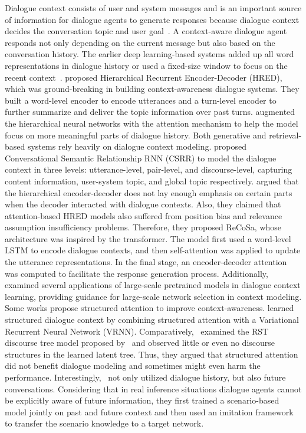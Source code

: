 \label{Context Awareness}
Dialogue context consists of user and system messages and is an important source of information for dialogue agents to generate responses because dialogue context decides the conversation topic and user goal~. A context-aware dialogue agent responds not only depending on the current message but also based on the conversation history. The earlier deep learning-based systems added up all word representations in dialogue history or used a fixed-size window to focus on the recent context~.  proposed Hierarchical Recurrent Encoder-Decoder (HRED), which was ground-breaking in building context-awareness dialogue systems. They built a word-level encoder to encode utterances and a turn-level encoder to further summarize and deliver the topic information over past turns.  augmented the hierarchical neural networks with the attention mechanism to help the model focus on more meaningful parts of dialogue history. 
Both generative and retrieval-based systems rely heavily on dialogue context modeling.  proposed Conversational Semantic Relationship RNN (CSRR) to model the dialogue context in three levels: utterance-level, pair-level, and discourse-level, capturing content information, user-system topic, and global topic respectively.  argued that the hierarchical encoder-decoder does not lay enough emphasis on certain parts when the decoder interacted with dialogue contexts. Also, they claimed that attention-based HRED models also suffered from position bias and relevance assumption insufficiency problems. Therefore, they proposed ReCoSa, whose architecture was inspired by the transformer. The model first used a word-level LSTM to encode dialogue contexts, and then self-attention was applied to update the utterance representations. In the final stage, an encoder-decoder attention was computed to facilitate the response generation process. Additionally,~ examined several applications of large-scale pretrained models in dialogue context learning, providing guidance for large-scale network selection in context modeling.
Some works propose structured attention to improve context-awareness.  learned structured dialogue context by combining structured attention with a Variational Recurrent Neural Network (VRNN). Comparatively,~ examined the RST discourse tree model proposed by~ and observed little or even no discourse structures in the learned latent tree. Thus, they argued that structured attention did not benefit dialogue modeling and sometimes might even harm the performance. 
Interestingly,~ not only utilized dialogue history, but also future conversations. Considering that in real inference situations dialogue agents cannot be explicitly aware of future information, they first trained a scenario-based model jointly on past and future context and then used an imitation framework to transfer the scenario knowledge to a target network. 
